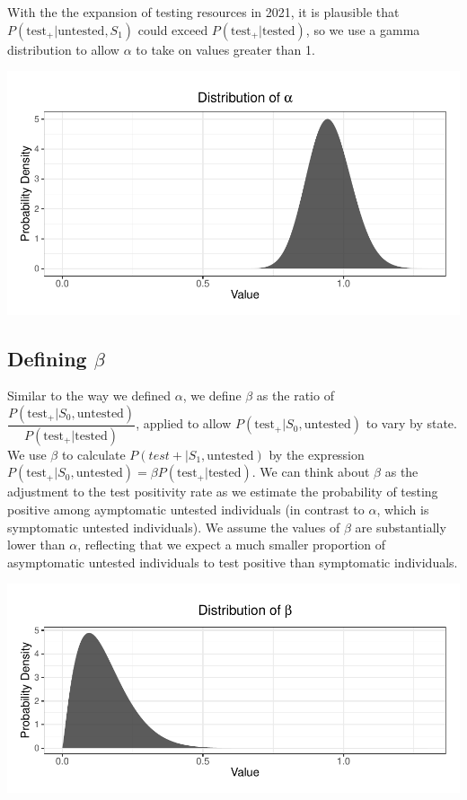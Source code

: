 \documentclass[12pt,twoside]{smiththesis}
\begin{document}
With the the expansion of testing resources in 2021, it is plausible that \(P(\text{test}_+|\text{untested},S_1)\) could exceed \(P(\text{test}_+|\text{tested})\), so we use a gamma distribution to allow \(\alpha\) to take on values greater than 1.
\begin{center}\includegraphics[width=0.8\linewidth]{thesis_files/figure-latex/unnamed-chunk-58-1} \end{center}

\hypertarget{defining-beta}{%
\subsection{\texorpdfstring{Defining \(\beta\)}{Defining \textbackslash beta}}\label{defining-beta}}

Similar to the way we defined \(\alpha\), we define \(\beta\) as the ratio of \(\dfrac{P(\text{test}_+ |S_0, \text{untested})}{P(\text{test}_+|\text{tested})}\), applied to allow \(P(\text{test}_+ |S_0, \text{untested})\) to vary by state. We use \(\beta\) to calculate \(P(test+|S_1, \text{untested})\) by the expression \(P(\text{test}_+|S_0, \text{untested}) =\beta P(\text{test}_+|\text{tested})\). We can think about \(\beta\) as the adjustment to the test positivity rate as we estimate the probability of testing positive among aymptomatic untested individuals (in contrast to \(\alpha\), which is symptomatic untested individuals). We assume the values of \(\beta\) are substantially lower than \(\alpha\), reflecting that we expect a much smaller proportion of asymptomatic untested individuals to test positive than symptomatic individuals.
\begin{center}\includegraphics[width=0.8\linewidth]{thesis_files/figure-latex/unnamed-chunk-59-1} \end{center}
\end{document}
